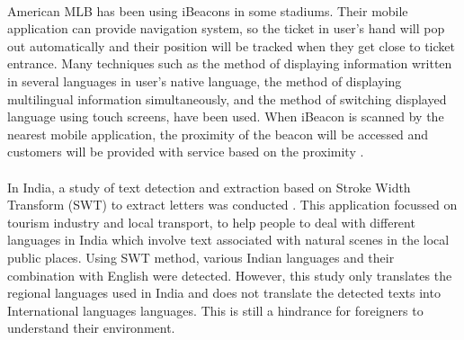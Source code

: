 \documentclass[12pt]{article}
\begin{document}
\paragraph{}American MLB has been using iBeacons in some stadiums. Their mobile application can provide navigation system, so the ticket in user's hand will pop out automatically and their position will be tracked when they get close to ticket entrance. Many techniques such as the method of displaying information written in several languages in user's native language, the method of displaying multilingual information simultaneously, and the method of switching displayed language using touch screens, have been used. \cite{zoo} When iBeacon is scanned by the nearest mobile application, the proximity of the beacon will be accessed and customers will be provided with service based on the proximity \cite{taiwan} \cite{room}.

\paragraph{}In India, a study of text detection and extraction based on Stroke Width Transform (SWT) to extract letters was conducted \cite{india}. This application focussed on tourism industry and local transport, to help people to deal with different languages in India which involve text associated with natural scenes in the local public places. Using SWT method, various Indian languages and their combination with English were detected. However, this study only translates the regional languages used in India and does not translate the detected texts into International languages languages. This is still a hindrance for foreigners to understand their environment.
\end{document}
